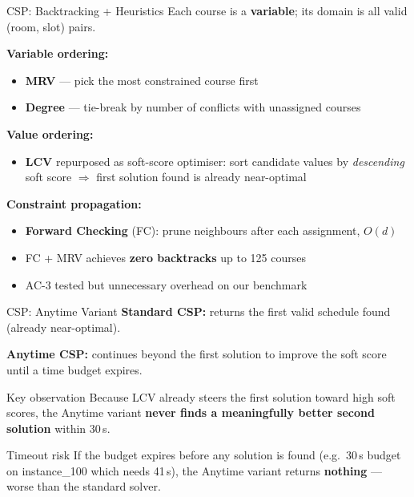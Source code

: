 \documentclass{beamer}
\begin{document}
\begin{frame}{CSP: Backtracking + Heuristics}
    Each course is a \textbf{variable}; its domain is all valid (room, slot) pairs.

    \bigskip
    \textbf{Variable ordering:}
    \begin{itemize}
        \item \textbf{MRV} — pick the most constrained course first
        \item \textbf{Degree} — tie-break by number of conflicts with unassigned courses
    \end{itemize}

    \bigskip
    \textbf{Value ordering:}
    \begin{itemize}
        \item \textbf{LCV} repurposed as soft-score optimiser: sort candidate values by \emph{descending} soft score $\Rightarrow$ first solution found is already near-optimal
    \end{itemize}

    \bigskip
    \textbf{Constraint propagation:}
    \begin{itemize}
        \item \textbf{Forward Checking} (FC): prune neighbours after each assignment, $O(d)$
        \item FC + MRV achieves \textbf{zero backtracks} up to 125 courses
        \item AC-3 tested but unnecessary overhead on our benchmark
    \end{itemize}
\end{frame}

\begin{frame}{CSP: Anytime Variant}
    \textbf{Standard CSP:} returns the first valid schedule found (already near-optimal).

    \bigskip
    \textbf{Anytime CSP:} continues beyond the first solution to improve the soft score until a time budget expires.

    \bigskip
    \begin{alertblock}{Key observation}
        Because LCV already steers the first solution toward high soft scores, the Anytime variant \textbf{never finds a meaningfully better second solution} within 30\,s.
    \end{alertblock}

    \bigskip
    \begin{block}{Timeout risk}
        If the budget expires before any solution is found (e.g.\ 30\,s budget on instance\_100 which needs 41\,s), the Anytime variant returns \textbf{nothing} — worse than the standard solver.
    \end{block}
\end{frame}
\end{document}
